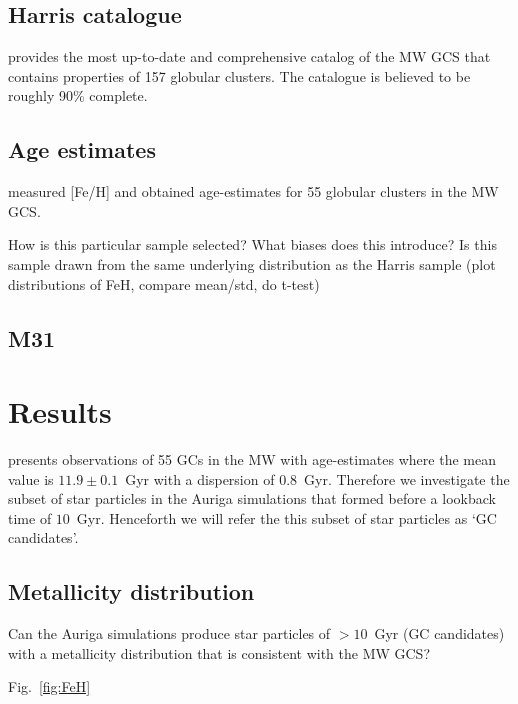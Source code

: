 \documentclass[a4paper,fleqn,usenatbib]{mnras}
\begin{document}
\subsection{Harris catalogue}
\label{sec:harris}
\citet[][2010 edition, H96]{1996AJ....112.1487H} provides the most up-to-date and comprehensive catalog of the MW GCS that contains properties of 157 globular clusters. The catalogue is believed to be roughly 90\% complete.

\subsection{Age estimates}
\label{sec:vandenberg}
\citet[][V13]{2013ApJ...775..134V} measured [Fe/H] and obtained age-estimates for 55 globular clusters in the MW GCS.


How is this particular sample selected? What biases does this introduce?
Is this sample drawn from the same underlying distribution as the Harris sample (plot distributions of FeH, compare mean/std, do t-test)

\subsection{M31}
\label{sec:m31}
\citep[][C11]{2011AJ....141...61C}
\citep{2014MNRAS.442.2165H, 2014MNRAS.442.2929V}




\section{Results}
\label{sec:results}
\citet{2013ApJ...775..134V} presents observations of 55 GCs in the MW with age-estimates
where the mean value is $11.9\pm0.1$~Gyr with a dispersion of $0.8$~Gyr. Therefore we
investigate the subset of star particles in the Auriga simulations that formed before a
lookback time of $10$~Gyr. Henceforth we will refer the this subset of star particles as
`GC candidates'. 

\subsection{Metallicity distribution}
\label{sec:metallicity}

Can the Auriga simulations produce star particles of $>10$~Gyr (GC candidates) with a metallicity distribution that is consistent with the MW GCS?

Fig.~\ref{fig:FeH}
\end{document}
